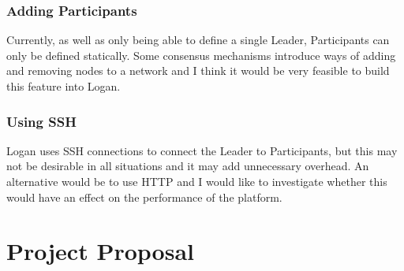 \documentclass[12pt,a4paper,twoside,openright]{report}
\begin{document}
	\subsection{Adding Participants}
	Currently, as well as only being able to define a single Leader, Participants can only be defined statically. 
	Some consensus mechanisms introduce ways of adding and removing nodes to a network and I think it would be very feasible to build this feature into Logan.
	
	\subsection{Using SSH}
	Logan uses SSH connections to connect the Leader to Participants, but this may not be desirable in all situations and it may add unnecessary overhead. 
	An alternative would be to use HTTP and I would like to investigate whether this would have an effect on the performance of the platform.

	
	
	
	\appendix

	\chapter{Project Proposal}
	
	
	
	
\end{document}
